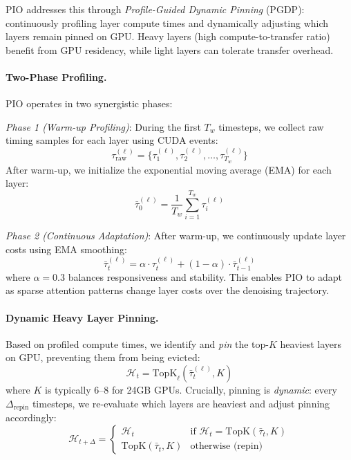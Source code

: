 PIO addresses this through \textit{Profile-Guided Dynamic Pinning} (PGDP): continuously profiling layer compute times and dynamically adjusting which layers remain pinned on GPU. Heavy layers (high compute-to-transfer ratio) benefit from GPU residency, while light layers can tolerate transfer overhead.

\paragraph{Two-Phase Profiling.}
PIO operates in two synergistic phases:

\textit{Phase 1 (Warm-up Profiling)}: During the first $T_w$ timesteps, we collect raw timing samples for each layer using CUDA events:
\begin{equation}
    \tau^{(\ell)}_{\text{raw}} = \{\tau^{(\ell)}_1, \tau^{(\ell)}_2, \ldots, \tau^{(\ell)}_{T_w}\}
\end{equation}
After warm-up, we initialize the exponential moving average (EMA) for each layer:
\begin{equation}
    \bar{\tau}^{(\ell)}_0 = \frac{1}{T_w} \sum_{i=1}^{T_w} \tau^{(\ell)}_i
\end{equation}

\textit{Phase 2 (Continuous Adaptation)}: After warm-up, we continuously update layer costs using EMA smoothing:
\begin{equation}
    \bar{\tau}^{(\ell)}_{t} = \alpha \cdot \tau^{(\ell)}_t + (1 - \alpha) \cdot \bar{\tau}^{(\ell)}_{t-1}
\end{equation}
where $\alpha = 0.3$ balances responsiveness and stability. This enables PIO to adapt as sparse attention patterns change layer costs over the denoising trajectory.

\paragraph{Dynamic Heavy Layer Pinning.}
Based on profiled compute times, we identify and \textit{pin} the top-$K$ heaviest layers on GPU, preventing them from being evicted:
\begin{equation}
    \mathcal{H}_t = \text{TopK}_{\ell}(\bar{\tau}^{(\ell)}_t, K)
\end{equation}
where $K$ is typically 6--8 for 24GB GPUs. Crucially, pinning is \textit{dynamic}: every $\Delta_{\text{repin}}$ timesteps, we re-evaluate which layers are heaviest and adjust pinning accordingly:
\begin{equation}
    \mathcal{H}_{t+\Delta} = \begin{cases}
        \mathcal{H}_t & \text{if } \mathcal{H}_t = \text{TopK}(\bar{\tau}_t, K) \\
        \text{TopK}(\bar{\tau}_t, K) & \text{otherwise (repin)}
    \end{cases}
\end{equation}

